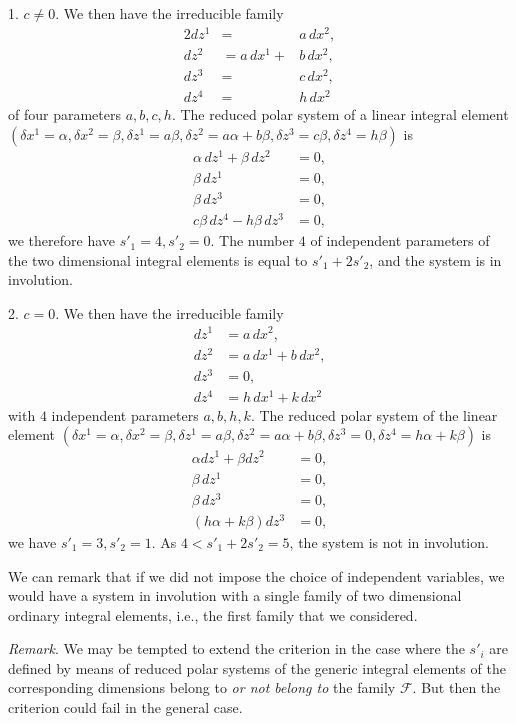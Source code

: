 \documentclass[leqno,11pt]{book}
\numberwithin{equation}{chapter}
\theoremstyle{shape1}
\theoremstyle{shape0}
\theoremstyle{shape2}
\theoremstyle{definition}
\begin{document}
1. $c\neq 0$. We then have the irreducible family
\begin{alignat*}{2}
  dz^{1}&=&a\,dx^{2},\\
  dz^{2}&=a\,dx^{1}+&b\,dx^{2},\\
  dz^{3}&=&c\,dx^{2},\\
  dz^{4}&=&h\,dx^{2}
\end{alignat*}
of four parameters $a,b,c,h$. The reduced polar system of a linear integral element $(\delta x^{1}=\alpha,\delta x^{2}=\beta,\delta z^{1}=a\beta,\delta z^{2}=a\alpha+b\beta,\delta z^{3}=c\beta,\delta z^{4}=h\beta)$ is
\begin{align*}
  \alpha\,dz^{1}+\beta\,dz^{2}&=0,\\
  \beta\,dz^{1}&=0,\\
  \beta\,dz^{3}&=0,\\
  c\beta\,dz^{4}-h\beta\,dz^{3}&=0,
\end{align*}
we therefore have $s'_{1}=4,s'_{2}=0$. The number $4$ of independent parameters of the two dimensional integral elements is equal to $s'_{1}+2s'_{2}$, and the system is in involution.

2. $c=0$. We then have the irreducible family
\begin{align*}
  dz^{1}&=a\,dx^{2},\\
  dz^{2}&=a\,dx^{1}+b\,dx^{2},\\
  dz^{3}&=0,\\
  dz^{4}&=h\,dx^{1}+k\,dx^{2}
\end{align*}
with $4$ independent parameters $a,b,h,k$. The reduced polar system of the linear element $(\delta x^{1}=\alpha,\delta x^{2}=\beta,\delta z^{1}=a\beta,\delta z^{2}=a\alpha+b\beta, \delta z^{3}=0,\delta z^{4}=h\alpha+k\beta)$ is
\begin{align*}
  \alpha dz^{1}+\beta dz^{2}&=0,\\
  \beta\,dz^{1}&=0,\\
  \beta\,dz^{3}&=0,\\
  (h\alpha+k\beta)dz^{3}&=0,
\end{align*}
we have $s'_{1}=3,s'_{2}=1$. As $4<s'_{1}+2s'_{2}=5$, the system is not in involution. 

We can remark that if we did not impose the choice of independent variables, we would have a system in involution with a single family of two dimensional ordinary integral elements, i.e., the first family that we considered.


\vspace{12pt}\fsec \emph{Remark}. We may be tempted to extend the criterion in the case where the $s'_{i}$ are defined by means of reduced polar systems of the generic integral elements of the corresponding dimensions belong to \emph{or not belong to} the family $\mathcal{F}$. But then the criterion could fail in the general case.
\end{document}
